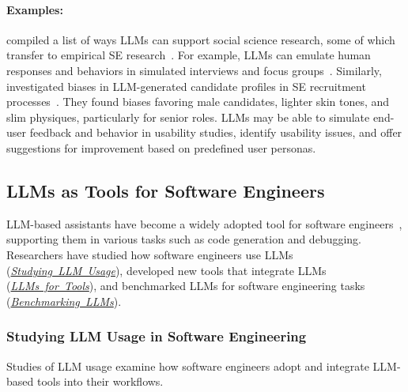 \documentclass[smallextended]{svjour3}
\newcommand{\llmusage}{\hyperref[sec:studying-llm-usage-in-software-engineering]{\mbox{\emph{Studying LLM Usage}}}\xspace}
\newcommand{\newtools}{\hyperref[sec:llms-for-new-software-engineering-tools]{\mbox{\emph{LLMs for Tools}}}\xspace}
\newcommand{\benchmarkingtasks}{\hyperref[sec:benchmarking-llms-for-software-engineering-tasks]{\mbox{\emph{Benchmarking LLMs}}}\xspace}
\newcommand{\llmusage}{\href{/study-types/usage/}{\emph{Studying LLM Usage}}\xspace}
\newcommand{\newtools}{\href{/study-types/tools/}{\emph{LLMs for Tools}}\xspace}
\newcommand{\benchmarkingtasks}{\href{/study-types/benchmarking/}{\emph{Benchmarking LLMs}}\xspace}
\newcommand{\studytypesubsection}[1]{\subsubsection{#1}}
\newcommand{\studytypeparagraph}[1]{\paragraph{\bfseries #1:}}
\newcommand{\studytypesubsection}[1]{\subsection{#1}}
\newcommand{\studytypeparagraph}[1]{\subsubsection{#1}}
\begin{document}
\studytypeparagraph{Examples}

\citeauthor{DBLP:journals/ipm/XuSRGPLSH24} compiled a list of ways LLMs can support social science research, some of which transfer to empirical SE research~\cite{DBLP:journals/ipm/XuSRGPLSH24}. For example, LLMs can emulate human responses and behaviors in simulated interviews and focus groups~\cite{DBLP:journals/ase/GerosaTSS24}. Similarly, \citeauthor{DBLP:conf/icse/BanoGH25} investigated biases in LLM-generated candidate profiles in SE recruitment processes~\cite{DBLP:conf/icse/BanoGH25}. They found biases favoring male candidates, lighter skin tones, and slim physiques, particularly for senior roles. LLMs may be able to simulate end-user feedback and behavior in usability studies, identify usability issues, and offer suggestions for improvement based on predefined user personas.
\space%

\subsection{LLMs as Tools for Software Engineers}
\label{sec:llms-as-tools-for-software-engineers}

LLM-based assistants have become a widely adopted tool for software engineers~\cite{stackoverflow2025survey}, supporting them in various tasks such as code generation and debugging.
Researchers have studied how software engineers use LLMs (\llmusage), developed new tools that integrate LLMs (\newtools), and benchmarked LLMs for software engineering tasks (\benchmarkingtasks).
\space%

\studytypesubsection{Studying LLM Usage in Software Engineering}
\label{sec:studying-llm-usage-in-software-engineering}

Studies of LLM usage examine how software engineers adopt and integrate LLM-based tools into their workflows.
\end{document}
